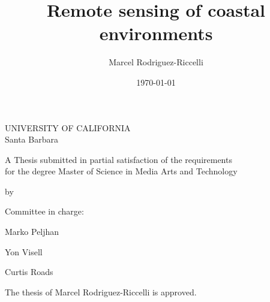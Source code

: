 \documentclass{article}
\title{Remote sensing of coastal environments}
\author{Marcel Rodriguez-Riccelli}
\date{\today}
\begin{document}

\begin{center}
\thispagestyle{empty}
\par{UNIVERSITY OF CALIFORNIA \\[.5cm] Santa Barbara} 
\vspace{1.25cm}
\par{\huge \thetitle}
\vspace{1.5cm}
\par{A Thesis submitted in partial satisfaction of the requirements \\ for the degree Master of Science in Media Arts and Technology}
\vspace{1cm}
{by \par}
\vspace{1cm}
{\theauthor}
\vspace{1.5cm}
\par{Committee in charge:}
\vspace{1cm}
\par{Marko Peljhan}
\vspace{1cm}
\par{Yon Visell}
\vspace{1cm}
\par{Curtis Roads}
\vspace{2cm}
\par{\thedate}
\end{center}


\newpage
\thispagestyle{empty}
\begin{center}
\par{The thesis of Marcel Rodriguez-Riccelli is approved.}
\vspace{2cm}
\par{\makebox[10cm][l]{\rule{10cm}{0.4pt}}\\
}
\vspace{1cm}
\par{\makebox[10cm][l]{\rule{10cm}{0.4pt}}\\
}
\vspace{1cm}
\par{\makebox[10cm][l]{\rule{10cm}{0.4pt}}\\
}
\vspace{2cm}
\par{\thedate}
\end{center}
\end{document}
